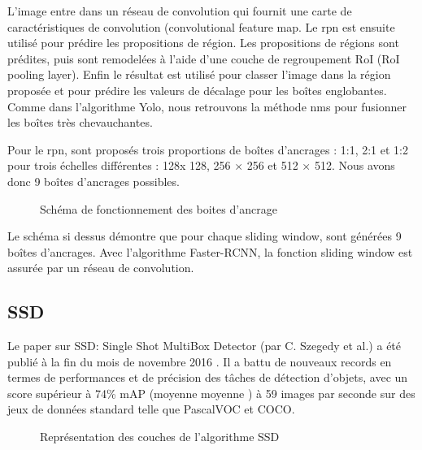 \documentclass[debug,nodate,hideweeklyreports]{polytech/polytech}
\begin{document}
L’image entre dans un réseau de convolution qui fournit une carte de caractéristiques de convolution (convolutional feature map. Le \gls{rpn} est ensuite utilisé pour prédire les propositions de région. Les propositions de régions sont prédites, puis sont remodelées à l'aide d'une couche de regroupement RoI (RoI pooling layer). Enfin le résultat est utilisé pour classer l'image dans la région proposée et pour prédire les valeurs de décalage pour les boîtes englobantes. Comme dans l’algorithme Yolo, nous retrouvons la méthode \gls{nms} pour fusionner les boîtes très chevauchantes.

Pour le \gls{rpn}, sont proposés trois proportions de boîtes d’ancrages : 1:1, 2:1 et 1:2 pour trois échelles différentes : 128x 128, 256 × 256 et 512 × 512. Nous avons donc 9 boîtes d’ancrages possibles.

\begin{figure}
  \caption{Schéma de fonctionnement des boites d'ancrage}
  \label{fig:fasterrcnnanchor}
\end{figure}

Le schéma si dessus démontre que pour chaque sliding window, sont générées 9 boîtes d’ancrages. Avec l’algorithme Faster-RCNN, la fonction sliding window est assurée par un réseau de convolution.

\subsection{SSD}

Le paper sur SSD: Single Shot MultiBox Detector (par C. Szegedy et al.) a été publié à la fin du mois de novembre 2016 \cite{DBLP:journals/corr/LiuAESR15}. Il a battu de nouveaux records en termes de performances et de précision des tâches de détection d’objets, avec un score supérieur à 74\% mAP (moyenne moyenne ) à 59 images par seconde sur des jeux de données standard telle que PascalVOC et COCO.

\begin{figure}
  \caption{Représentation des couches de l'algorithme SSD}
  \label{fig:ssdlayers}
\end{figure}
\end{document}
